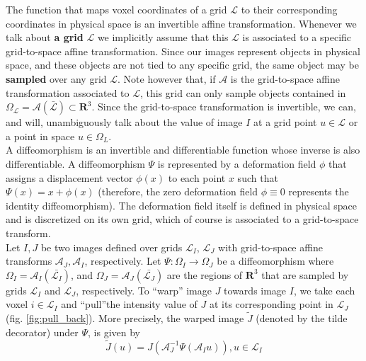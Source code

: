 \documentclass[11pt]{article}
\begin{document}
The function that maps voxel coordinates of a grid $\mathcal{L}$ to their corresponding coordinates in physical space is an invertible affine transformation. Whenever we talk about
\textbf{a grid} $\mathcal{L}$ we implicitly assume that this $\mathcal{L}$ is associated to a specific grid-to-space affine transformation.
Since our images represent objects in physical space, and these objects are not tied to any specific grid, the same object may be \textbf{sampled} over any grid $\mathcal{L}$.
Note however that, if $\mathcal{A}$ is the grid-to-space affine transformation associated to $\mathcal{L}$, this grid can only sample objects contained in
$\Omega_{\mathcal{L}} = \mathcal{A}(\bar{\mathcal{L}}) \subset \mathbf{R}^{3}$. Since the grid-to-space transformation is invertible, we can, and will, unambiguously talk about the
value of image $I$ at a grid point $u\in \mathcal{L}$ or a point in space $u \in \Omega_{L}$.\\

A diffeomorphism is an invertible and differentiable function whose inverse is also differentiable. A diffeomorphism $\Psi$ is represented by a
deformation field $\phi$ that assigns a displacement vector $\phi(x)$ to each point $x$ such that $\Psi(x) = x + \phi(x)$ (therefore, the zero deformation field $\phi \equiv 0$
represents the identity diffeomorphism). The deformation field itself is defined in physical space and is discretized on its own grid, which of course is associated to
a grid-to-space transform.\\

Let $I, J$ be two images defined over grids $\mathcal{L}_{I}$, $\mathcal{L}_{J}$ with grid-to-space affine transforms $\mathcal{A}_{J}, \mathcal{A}_{I}$, respectively. Let
$\Psi:\Omega_{I} \rightarrow \Omega_{J}$ be a diffeomorphism where $\Omega_{I} = \mathcal{A}_{I}(\bar{\mathcal{L}_{I}})$,
and $\Omega_{J} = \mathcal{A}_{J}(\bar{\mathcal{L}_{J}})$ are the regions of $\mathbf{R}^{3}$ that are sampled by grids $\mathcal{L}_{I}$ and $\mathcal{L}_{J}$, respectively.
To ``warp'' image $J$ towards image $I$, we take each voxel $i \in \mathcal{L}_{I}$ and ``pull''the intensity value of $J$ at its corresponding point in $\mathcal{L}_{J}$
(fig. \ref{fig:pull_back}). More precisely, the warped image $\tilde{J}$ (denoted by the tilde decorator) under $\Psi$, is given by
\begin{equation}\label{eq:warp_definition}
    \tilde{J}(u) = J(\mathcal{A}_{J}^{-1}\Psi(\mathcal{A}_{I}u)), u \in \mathcal{L}_{I}
\end{equation}
\end{document}
